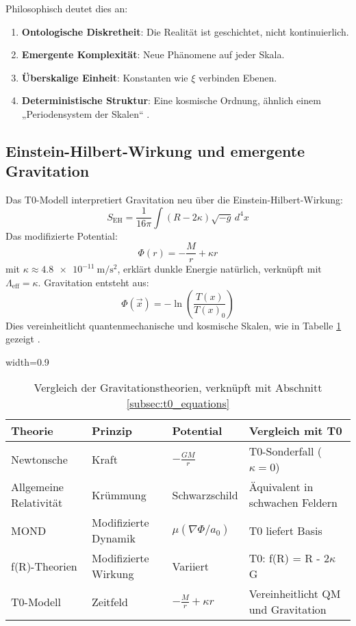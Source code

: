 \documentclass[12pt,a4paper]{article}
\newcommand{\Tfield}{T(x)}
\newcommand{\tablescale}{0.9}
\begin{document}
	Philosophisch deutet dies an:
	\begin{enumerate}
		\item \textbf{Ontologische Diskretheit}: Die Realität ist geschichtet, nicht kontinuierlich.
		\item \textbf{Emergente Komplexität}: Neue Phänomene auf jeder Skala.
		\item \textbf{Überskalige Einheit}: Konstanten wie \(\xi\) verbinden Ebenen.
		\item \textbf{Deterministische Struktur}: Eine kosmische Ordnung, ähnlich einem „Periodensystem der Skalen“ \cite{pascher_perspective_2025}.
	\end{enumerate}
	
	\subsection{Einstein-Hilbert-Wirkung und emergente Gravitation}
	\label{sec:gravitation}
	
	Das T0-Modell interpretiert Gravitation neu über die Einstein-Hilbert-Wirkung:
	\[
	S_{\text{EH}} = \frac{1}{16 \pi} \int (R - 2 \kappa) \sqrt{-g} \, d^4x
	\]
	Das modifizierte Potential:
	\[
	\Phi(r) = -\frac{M}{r} + \kappa r
	\]
	mit \(\kappa \approx \SI{4.8e-11}{\meter\per\second\squared}\), erklärt dunkle Energie natürlich, verknüpft mit \(\Lambda_{\text{eff}} = \kappa\). Gravitation entsteht aus:
	\[
	\Phi(\vec{x}) = -\ln\left(\frac{\Tfield}{\Tfield_0}\right)
	\]
	Dies vereinheitlicht quantenmechanische und kosmische Skalen, wie in Tabelle \ref{tab:theory_comparison} gezeigt \cite{pascher_emergente_2025}.
	
	\begin{table}[htbp]
		\centering
		\begin{adjustbox}{width=\tablescale\textwidth}
			\begin{tabular}{p{3cm}p{3cm}p{4cm}p{4cm}}
				\toprule
				\textbf{Theorie} & \textbf{Prinzip} & \textbf{Potential} & \textbf{Vergleich mit T0} \\
				\midrule
				Newtonsche & Kraft & \(-\frac{G M}{r}\) & T0-Sonderfall (\(\kappa = 0\)) \\
				Allgemeine Relativität & Krümmung & Schwarzschild & Äquivalent in schwachen Feldern \\
				MOND & Modifizierte Dynamik & \(\mu(\nabla \Phi/a_0)\) & T0 liefert Basis \\
				f(R)-Theorien & Modifizierte Wirkung & Variiert & T0: f(R) = R - 2\(\kappa\) G \\
				T0-Modell & Zeitfeld & \(-\frac{M}{r} + \kappa r\) & Vereinheitlicht QM und Gravitation \\
				\bottomrule
			\end{tabular}
		\end{adjustbox}
		\caption{Vergleich der Gravitationstheorien, verknüpft mit Abschnitt \ref{subsec:t0_equations}}
		\label{tab:theory_comparison}
	\end{table}
	
\end{document}
